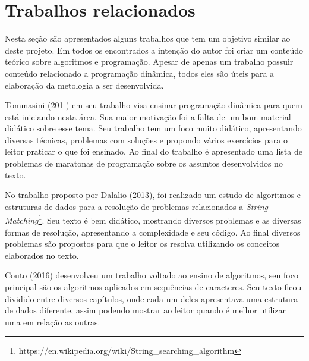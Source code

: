 
\chapter{Trabalhos relacionados}
\label{chap:historico}

Nesta seção são apresentados alguns trabalhos que tem um objetivo similar ao deste projeto. Em todos os encontrados a intenção do autor foi criar um conteúdo teórico sobre algoritmos e programação. Apesar de apenas um trabalho possuir conteúdo relacionado a programação dinâmica, todos eles são úteis para a elaboração da metologia a ser desenvolvida.

Tommasini (201-) em seu trabalho visa ensinar programação dinâmica para quem está iniciando nesta área. Sua maior motivação foi a falta de um bom material didático sobre esse tema. Seu trabalho tem um foco muito didático, apresentando diversas técnicas, problemas com soluções e propondo vários exercícios para o leitor praticar o que foi ensinado. Ao final do trabalho é apresentado uma lista de problemas de maratonas de programação sobre os assuntos desenvolvidos no texto.


No trabalho proposto por Dalalio (2013), foi realizado um estudo de algoritmos e estruturas de dados para a resolução de problemas relacionados a \textit{String Matching}\footnote{https://en.wikipedia.org/wiki/String\_searching\_algorithm}. Seu texto é bem didático, mostrando diversos problemas e as diversas formas de resolução, apresentando a complexidade e seu código. Ao final diversos problemas são propostos para que o leitor os resolva utilizando os conceitos elaborados no texto.


Couto (2016) desenvolveu um trabalho voltado ao ensino de algoritmos, seu foco principal são os algoritmos aplicados em sequências de caracteres. Seu texto ficou dividido entre diversos capítulos, onde cada um deles apresentava uma estrutura de dados diferente, assim podendo mostrar ao leitor quando é melhor utilizar uma em relação as outras.






